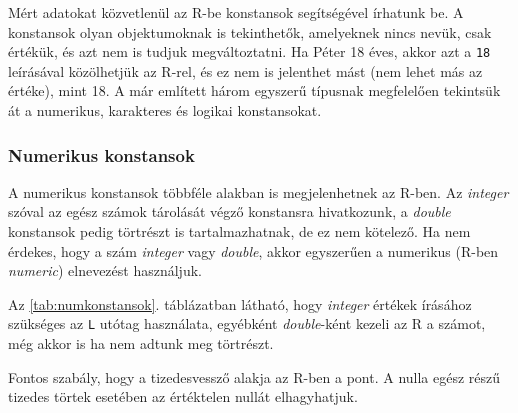 \documentclass[
]{book}
\begin{document}
Mért adatokat közvetlenül az R-be konstansok segítségével írhatunk be. A konstansok olyan objektumoknak is tekinthetők, amelyeknek nincs nevük, csak értékük, és azt nem is tudjuk megváltoztatni. Ha Péter 18 éves, akkor azt a \texttt{18} leírásával közölhetjük az R-rel, és ez nem is jelenthet mást (nem lehet más az értéke), mint 18. A már említett három egyszerű típusnak megfelelően tekintsük át a numerikus, karakteres és logikai konstansokat.

\hypertarget{numerikus-konstansok}{%
\subsubsection{Numerikus konstansok}\label{numerikus-konstansok}}

A numerikus konstansok többféle alakban is megjelenhetnek az R-ben. Az \emph{integer} szóval az egész számok tárolását végző konstansra hivatkozunk, a \emph{double} konstansok pedig törtrészt is tartalmazhatnak, de ez nem kötelező. Ha nem érdekes, hogy a szám \emph{integer} vagy \emph{double}, akkor egyszerűen a numerikus (R-ben \emph{numeric}) elnevezést használjuk.

\begin{table}

\caption{\label{tab:numkonstansok}Numerikus konstansok írása}
\centering
{}
\end{table}

Az \ref{tab:numkonstansok}. táblázatban látható, hogy \emph{integer} értékek írásához szükséges az \texttt{L} utótag használata, egyébként \emph{double}-ként kezeli az R a számot, még akkor is ha nem adtunk meg törtrészt.

Fontos szabály, hogy a tizedesvessző alakja az R-ben a pont. A nulla egész részű tizedes törtek esetében az értéktelen nullát elhagyhatjuk.
\end{document}
